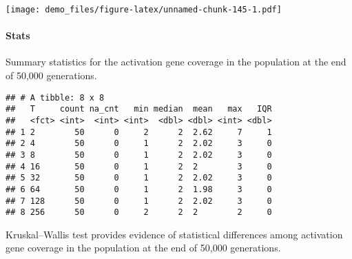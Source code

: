 \documentclass[]{book}
\newenvironment{Shaded}{\begin{snugshade}}{\end{snugshade}}
\newcommand{\DataTypeTok}[1]{\textcolor[rgb]{0.13,0.29,0.53}{#1}}
\newcommand{\KeywordTok}[1]{\textcolor[rgb]{0.13,0.29,0.53}{\textbf{#1}}}
\newcommand{\NormalTok}[1]{#1}
\newcommand{\OperatorTok}[1]{\textcolor[rgb]{0.81,0.36,0.00}{\textbf{#1}}}
\newcommand{\OtherTok}[1]{\textcolor[rgb]{0.56,0.35,0.01}{#1}}
\newcommand{\StringTok}[1]{\textcolor[rgb]{0.31,0.60,0.02}{#1}}
\let\oldparagraph\paragraph
\renewcommand{\paragraph}[1]{\oldparagraph{#1}\mbox{}}
\begin{document}
\texttt{[image: demo\_files/figure-latex/unnamed-chunk-145-1.pdf]}

\hypertarget{stats-28}{%
\paragraph{Stats}\label{stats-28}}

Summary statistics for the activation gene coverage in the population at the end of 50,000 generations.

\begin{Shaded}
\end{Shaded}

\begin{verbatim}
## # A tibble: 8 x 8
##   T     count na_cnt   min median  mean   max   IQR
##   <fct> <int>  <int> <int>  <dbl> <dbl> <int> <dbl>
## 1 2        50      0     2      2  2.62     7     1
## 2 4        50      0     1      2  2.02     3     0
## 3 8        50      0     1      2  2.02     3     0
## 4 16       50      0     1      2  2        3     0
## 5 32       50      0     1      2  2.02     3     0
## 6 64       50      0     1      2  1.98     3     0
## 7 128      50      0     1      2  2.02     3     0
## 8 256      50      0     2      2  2        2     0
\end{verbatim}

Kruskal--Wallis test provides evidence of statistical differences among activation gene coverage in the population at the end of 50,000 generations.
\end{document}

